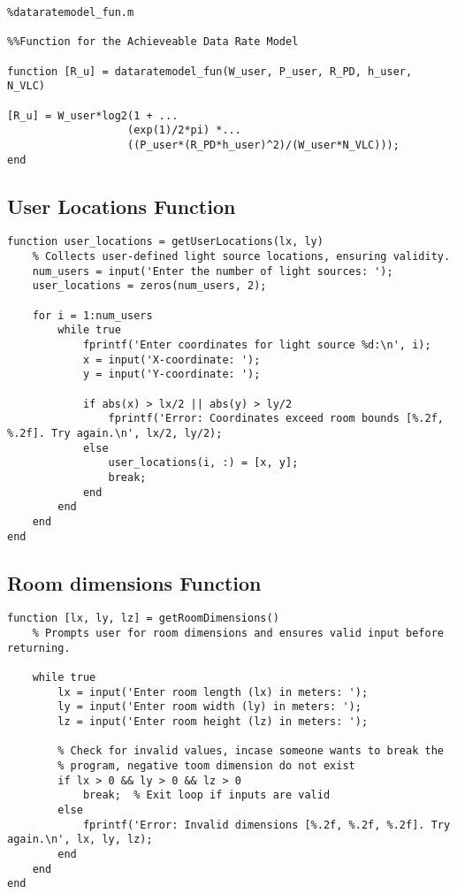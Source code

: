 \begin{lstlisting}
%dataratemodel_fun.m

%%Function for the Achieveable Data Rate Model

function [R_u] = dataratemodel_fun(W_user, P_user, R_PD, h_user, N_VLC)

[R_u] = W_user*log2(1 + ...
                   (exp(1)/2*pi) *...
                   ((P_user*(R_PD*h_user)^2)/(W_user*N_VLC)));
end
\end{lstlisting}

\newpage
\subsection{User Locations Function}

\begin{lstlisting}
function user_locations = getUserLocations(lx, ly)
    % Collects user-defined light source locations, ensuring validity.
    num_users = input('Enter the number of light sources: ');
    user_locations = zeros(num_users, 2);

    for i = 1:num_users
        while true
            fprintf('Enter coordinates for light source %d:\n', i);
            x = input('X-coordinate: ');
            y = input('Y-coordinate: ');

            if abs(x) > lx/2 || abs(y) > ly/2
                fprintf('Error: Coordinates exceed room bounds [%.2f, %.2f]. Try again.\n', lx/2, ly/2);
            else
                user_locations(i, :) = [x, y];
                break;
            end
        end
    end
end
\end{lstlisting}

\newpage
\subsection{Room dimensions Function}

\begin{lstlisting}
function [lx, ly, lz] = getRoomDimensions()
    % Prompts user for room dimensions and ensures valid input before returning.

    while true
        lx = input('Enter room length (lx) in meters: ');
        ly = input('Enter room width (ly) in meters: ');
        lz = input('Enter room height (lz) in meters: ');

        % Check for invalid values, incase someone wants to break the
        % program, negative toom dimension do not exist
        if lx > 0 && ly > 0 && lz > 0
            break;  % Exit loop if inputs are valid
        else
            fprintf('Error: Invalid dimensions [%.2f, %.2f, %.2f]. Try again.\n', lx, ly, lz);
        end
    end
end
\end{lstlisting}

